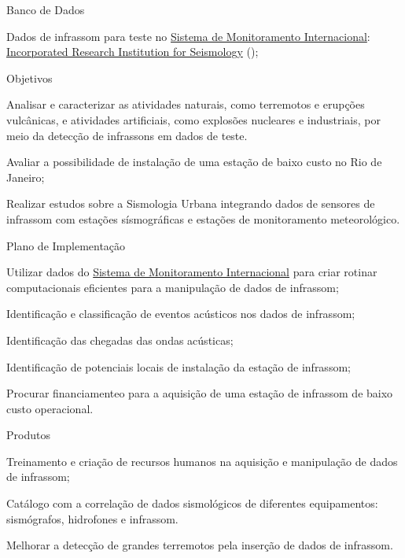\documentclass[10pt,a4paper,oneside]{book}
\begin{document}
\begin{fancyenum}{\faDatabase}{Banco de Dados}
	\item Dados de infrassom para teste no \href{https://www.ctbto.org/our-work/international-monitoring-system}{Sistema de Monitoramento Internacional}: \href{https://ds.iris.edu/gmap/\#network=IM\&planet=earth}{Incorporated Research Institution for Seismology} (\faUnlock);
\end{fancyenum}

\begin{fancyenum}{\faFutbol}{Objetivos}
	\item Analisar e caracterizar as atividades naturais, como terremotos e erupções vulcânicas, e atividades artificiais, como explosões nucleares e industriais, por meio da detecção de infrassons em dados de teste.
	\item Avaliar a possibilidade de instalação de uma estação de baixo custo no Rio de Janeiro;
	\item Realizar estudos sobre a Sismologia Urbana integrando dados de sensores de infrassom com estações sísmográficas e estações de monitoramento meteorológico.
\end{fancyenum}

\begin{fancyenum}{\faBrain}{Plano de Implementação}
	\item Utilizar dados do \href{https://www.ctbto.org/our-work/international-monitoring-system}{Sistema de Monitoramento Internacional} para criar rotinar computacionais eficientes para a manipulação de dados de infrassom;
	\item Identificação e classificação de eventos acústicos nos dados de infrassom;
	\item Identificação das chegadas das ondas acústicas;
	\item Identificação de potenciais locais de instalação da estação de infrassom;
	\item Procurar financiamenteo para a aquisição de uma estação de infrassom de baixo custo operacional.
\end{fancyenum}

\begin{fancyenum}{\faShoppingCart}{Produtos}
	\item Treinamento e criação de recursos humanos na aquisição e manipulação de dados de infrassom;
	\item Catálogo com a correlação de dados sismológicos de diferentes equipamentos: sismógrafos, hidrofones e infrassom.
	\item Melhorar a detecção de grandes terremotos pela inserção de dados de infrassom.
\end{fancyenum}
\end{document}

